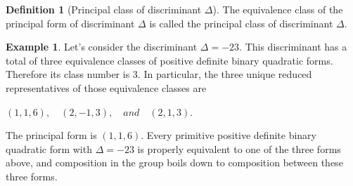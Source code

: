 \documentclass{article}
\theoremstyle{definition}
\newtheorem{definition}{Definition}[section]
\theoremstyle{theorem}
\theoremstyle{example}
\newtheorem{example}{Example}[section]
\theoremstyle{corollary}
\begin{document}
\bigskip

\theoremstyle{definition}
\begin{definition}[Principal class of discriminant \(\Delta\)]
The equivalence class of the principal form of discriminant \(\Delta\) is called the principal class of discriminant \(\Delta\).
\end{definition}

\bigskip

\theoremstyle{example}
\begin{example}
Let's consider the discriminant \(\Delta = -23\). This discriminant has a total of three equivalence classes of positive definite binary quadratic forms. Therefore its class number is 3. In particular, the three unique reduced representatives of those equivalence classes are
\begin{center}
\((1, 1, 6), \quad (2, -1, 3), \quad and \quad (2, 1, 3)\).
\end{center}
The principal form is \((1, 1, 6)\). Every primitive positive definite binary quadratic form with \(\Delta = -23\) is properly equivalent to one of the three forms above, and composition in the group boils down to composition between these three forms. \square
\end{example}

\bigskip
\end{document}
